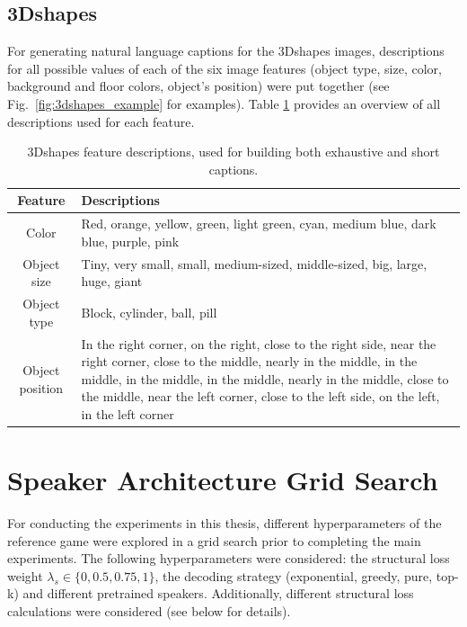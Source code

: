 \subsection{3Dshapes}
For generating natural language captions for the 3Dshapes images, descriptions for all possible values of each of the six image features (object type, size, color, background and floor colors, object's position) were put together (see Fig.~\ref{fig:3dshapes_example} for examples). Table \ref{tab:shapes_vocab} provides an overview of all descriptions used for each feature.

\begin{table}[h]
	\begin{tabularx}{\linewidth}{|c|X|}
		
	 \hline
	 \textbf{Feature} & \textbf{Descriptions}\\ \hline
	 Color & Red, orange, yellow, green, light green, cyan, medium blue, dark blue, purple, pink \\ \hline
	 Object size & Tiny, very small, small, medium-sized, middle-sized, big, large, huge, giant \\ \hline
	 Object type & Block, cylinder, ball, pill \\ \hline
	 Object position & In the right corner, on the right, close to the right side, near the right corner, close to the middle, nearly in the middle, in the middle, in the middle, in the middle, nearly in the middle, close to the middle, near the left corner, close to the left side, on the left, in the left corner \\ \hline
	\end{tabularx}
\caption{3Dshapes feature descriptions, used for building both exhaustive and short captions.\label{tab:shapes_vocab}}
\end{table}

\section{Speaker Architecture Grid Search}
\label{app:grid_search}

For conducting the experiments in this thesis, different hyperparameters of the reference game were explored in a grid search prior to completing the main experiments. The following hyperparameters were considered: the structural loss weight $\lambda_s \in \{0, 0.5, 0.75, 1\}$, the decoding strategy (exponential, greedy, pure, top-k) and different pretrained speakers. Additionally, different structural loss calculations were considered (see below for details). 

